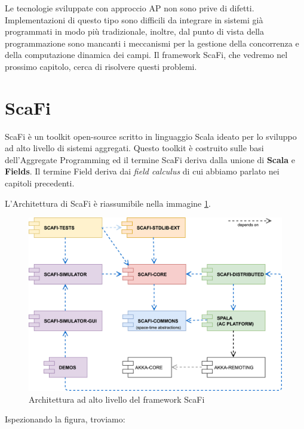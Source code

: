 \documentclass[12pt,a4paper,openright,twoside]{book}
\begin{document}
Le tecnologie sviluppate con approccio \ac{AP} non sono prive di difetti. 
Implementazioni di questo tipo sono difficili da integrare in sistemi già programmati in modo più tradizionale, inoltre, dal punto di vista della programmazione sono mancanti i meccanismi per la gestione della concorrenza e della computazione dinamica dei campi. Il framework ScaFi, che vedremo nel prossimo capitolo, cerca di risolvere questi problemi.


\section{ScaFi}

ScaFi è un toolkit open-source scritto in linguaggio Scala ideato per lo sviluppo ad alto livello di sistemi aggregati. Questo toolkit è costruito sulle basi dell'Aggregate Programming ed il termine ScaFi deriva dalla unione di \textbf{Scala} e \textbf{Fields}. Il termine Field deriva dai \textit{field calculus} di cui abbiamo parlato nei capitoli precedenti.

L'Architettura di ScaFi \cite{Casadei2022} è riassumibile nella immagine \ref{fig:scafi-arc}.

\begin{figure}
    \centering
    \includegraphics[width=.8\linewidth]{figures/scafi-arc.jpg}
    \caption{Architettura ad alto livello del framework ScaFi}
    \label{fig:scafi-arc}
\end{figure}

Ispezionando la figura, troviamo:
\end{document}
